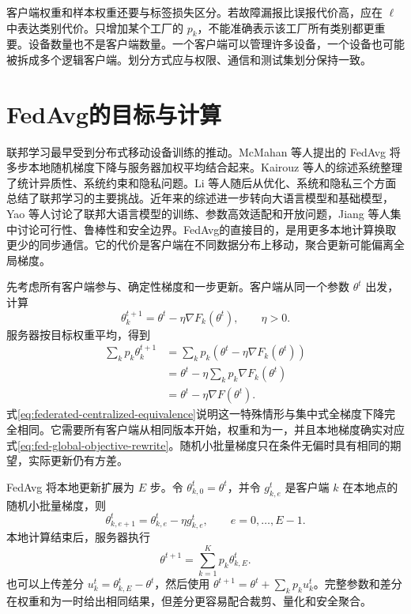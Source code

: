 客户端权重和样本权重还要与标签损失区分。若故障漏报比误报代价高，应在 $\ell$ 中表达类别代价。只增加某个工厂的 $p_k$，不能准确表示该工厂所有类别都更重要。设备数量也不是客户端数量。一个客户端可以管理许多设备，一个设备也可能被拆成多个逻辑客户端。划分方式应与权限、通信和测试集划分保持一致。

\section{FedAvg的目标与计算}

联邦学习最早受到分布式移动设备训练的推动。McMahan 等人提出的 FedAvg 将多步本地随机梯度下降与服务器加权平均结合起来\cite{mcmahan2017fedavg}。Kairouz 等人的综述系统整理了统计异质性、系统约束和隐私问题\cite{kairouz2019advances}。Li 等人随后从优化、系统和隐私三个方面总结了联邦学习的主要挑战\cite{li2020federatedsurvey}。近年来的综述进一步转向大语言模型和基础模型，Yao 等人讨论了联邦大语言模型的训练、参数高效适配和开放问题\cite{yao2024federatedllm}，Jiang 等人集中讨论可行性、鲁棒性和安全边界\cite{jiang2025federatedllm}。FedAvg的直接目的，是用更多本地计算换取更少的同步通信。它的代价是客户端在不同数据分布上移动，聚合更新可能偏离全局梯度。

先考虑所有客户端参与、确定性梯度和一步更新。客户端从同一个参数 $\theta^t$ 出发，计算
\begin{equation}
 \theta_k^{t+1}=\theta^t-\eta\nabla F_k(\theta^t),
 \qquad \eta>0.
\end{equation}
服务器按目标权重平均，得到
\begin{align}
 \sum_kp_k\theta_k^{t+1}
 &=\sum_kp_k\left(\theta^t-\eta\nabla F_k(\theta^t)\right)\\
 &=\theta^t-\eta\sum_kp_k\nabla F_k(\theta^t)\\
 &=\theta^t-\eta\nabla F(\theta^t).
 \label{eq:federated-centralized-equivalence}
\end{align}
式\eqref{eq:federated-centralized-equivalence}说明这一特殊情形与集中式全梯度下降完全相同。它需要所有客户端从相同版本开始，权重和为一，并且本地梯度确实对应式\eqref{eq:fed-global-objective-rewrite}。随机小批量梯度只在条件无偏时具有相同的期望，实际更新仍有方差。

FedAvg 将本地更新扩展为 $E$ 步。令 $\theta_{k,0}^t=\theta^t$，并令 $g_{k,e}^t$ 是客户端 $k$ 在本地点的随机小批量梯度，则
\begin{equation}
 \theta_{k,e+1}^t=\theta_{k,e}^t-\eta g_{k,e}^t,
 \qquad e=0,\ldots,E-1.
 \label{eq:fedavg-local-update-rewrite}
\end{equation}
本地计算结束后，服务器执行
\begin{equation}
 \theta^{t+1}=\sum_{k=1}^{K}p_k\theta_{k,E}^t.
 \label{eq:fedavg-aggregation-rewrite}
\end{equation}
也可以上传差分 $u_k^t=\theta_{k,E}^t-\theta^t$，然后使用 $\theta^{t+1}=\theta^t+\sum_kp_ku_k^t$。完整参数和差分在权重和为一时给出相同结果，但差分更容易配合裁剪、量化和安全聚合。

